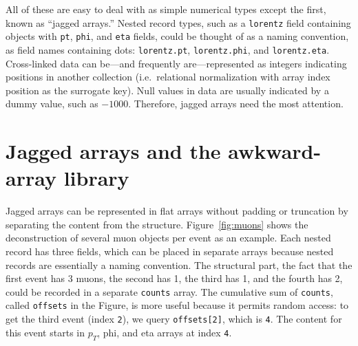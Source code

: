 \documentclass[a4paper]{jpconf}
\begin{document}
All of these are easy to deal with as simple numerical types except the first, known as ``jagged arrays.'' Nested record types, such as a {\tt lorentz} field containing objects with {\tt pt}, {\tt phi}, and {\tt eta} fields, could be thought of as a naming convention, as field names containing dots: {\tt lorentz.pt}, {\tt lorentz.phi}, and {\tt lorentz.eta}. Cross-linked data can be---and frequently are---represented as integers indicating positions in another collection (i.e.\ relational normalization with array index position as the surrogate key). Null values in data are usually indicated by a dummy value, such as $-1000$. Therefore, jagged arrays need the most attention.

\section{Jagged arrays and the awkward-array library}

Jagged arrays can be represented in flat arrays without padding or truncation by separating the content from the structure. Figure~\ref{fig:muons} shows the deconstruction of several muon objects per event as an example. Each nested record has three fields, which can be placed in separate arrays because nested records are essentially a naming convention. The structural part, the fact that the first event has 3 muons, the second has 1, the third has 1, and the fourth has 2, could be recorded in a separate {\tt counts} array. The cumulative sum of {\tt counts}, called {\tt offsets} in the Figure, is more useful because it permits random access: to get the third event (index {\tt 2}), we query {\tt offsets[2]}, which is {\tt 4}. The content for this event starts in $p_T$, phi, and eta arrays at index {\tt 4}.
\end{document}
